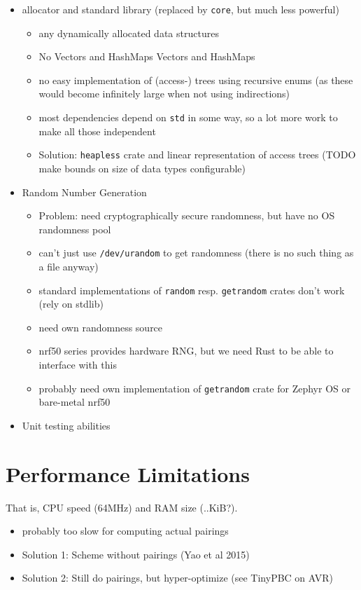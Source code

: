 \begin{itemize}
    \item allocator and standard library (replaced by \texttt{core}, but much less powerful)
    \begin{itemize}
        \item any dynamically allocated data structures
        \item No Vectors and HashMaps Vectors and HashMaps
        \item no easy implementation of (access-) trees using recursive enums (as these would become infinitely large when not using indirections)
        \item most dependencies depend on \texttt{std} in some way, so a lot more work to make all those independent
        \item Solution: \texttt{heapless} crate and linear representation of access trees (TODO make bounds on size of data types configurable)
    \end{itemize}
    \item Random Number Generation
    \begin{itemize}
        \item Problem: need cryptographically secure randomness, but have no OS randomness pool
        \item can't just use \texttt{/dev/urandom} to get randomness (there is no such thing as a file anyway)
        \item standard implementations of \texttt{random} resp. \texttt{getrandom} crates don't work (rely on stdlib)
        \item need own randomness source
        \item nrf50 series provides hardware RNG, but we need Rust to be able to interface with this
        \item probably need own implementation of \texttt{getrandom} crate for Zephyr OS or bare-metal nrf50
    \end{itemize}
    \item Unit testing abilities
\end{itemize}

\section{Performance Limitations}
That is, CPU speed (64MHz) and RAM size (..KiB?). 
\begin{itemize}
    \item probably too slow for computing actual pairings
    \item Solution 1: Scheme without pairings (Yao et al 2015) 
    \item Solution 2: Still do pairings, but hyper-optimize (see TinyPBC on AVR)
\end{itemize}